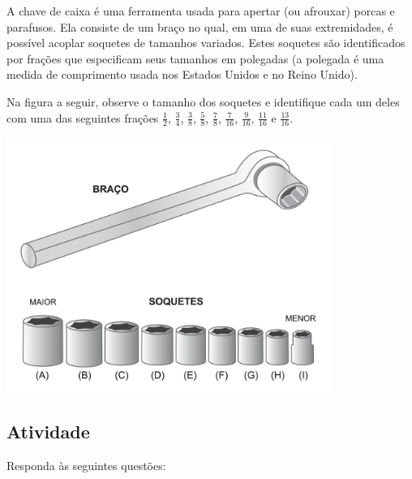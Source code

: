 A chave de caixa é uma ferramenta usada para apertar (ou afrouxar) porcas e parafusos. Ela consiste
de um braço no qual, em uma de suas extremidades, é possível acoplar soquetes de tamanhos variados.
Estes soquetes são identificados por frações que especificam seus tamanhos em polegadas (a polegada é uma medida de comprimento usada nos Estados Unidos e no Reino Unido).

Na figura a seguir, observe o tamanho dos soquetes e identifique cada um deles com uma das seguintes frações $\frac{1}{2}$, $\frac{3}{4}$, $\frac{3}{8}$, $\frac{5}{8}$, $\frac{7}{8}$, $\frac{7}{16}$, $\frac{9}{16}$, $\frac{11}{16}$ e $\frac{13}{16}$.

\begin{center}
    \includegraphics[width=300pt, keepaspectratio]{../media/cap4/secoes/pngs/ativ14_fig01.png}
\end{center}

\subsection{Atividade}

Responda às seguintes questões:

